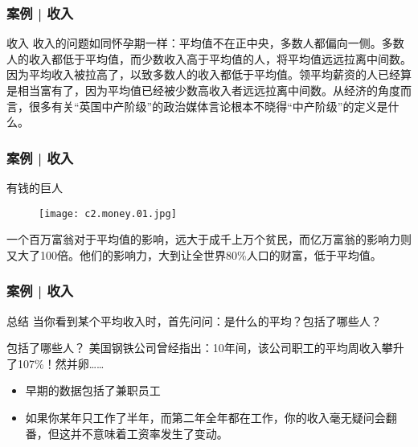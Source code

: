\begin{frame}
  \frametitle{案例 | 收入}
  \begin{block}{收入}
    收入的问题如同怀孕期一样：平均值不在正中央，多数人都偏向一侧。多数人的收入都低于平均值，而少数收入高于平均值的人，将平均值远远拉离中间数。因为平均收入被拉高了，以致多数人的收入都低于平均值。领平均薪资的人已经算是相当富有了，因为平均值已经被少数高收入者远远拉离中间数。从经济的角度而言，很多有关“英国中产阶级”的政治媒体言论根本不晓得“中产阶级”的定义是什么。
  \end{block}
\end{frame}

\begin{frame}
  \frametitle{案例 | 收入}
  \begin{block}{有钱的巨人}
  \begin{figure}
    \centering
    \texttt{[image: c2.money.01.jpg]}
  \end{figure}
  一个百万富翁对于平均值的影响，远大于成千上万个贫民，而亿万富翁的影响力则又大了100倍。他们的影响力，大到让全世界80\%人口的财富，低于平均值。
  \end{block}
\end{frame}

\begin{frame}
  \frametitle{案例 | 收入}
  \begin{block}{总结}
    当你看到某个平均收入时，首先问问：是什么的平均？包括了哪些人？
  \end{block}
  \pause
  \begin{block}{包括了哪些人？}
    美国钢铁公司曾经指出：10年间，该公司职工的平均周收入攀升了107\%！然并卵……
    \begin{itemize}
      \item 早期的数据包括了兼职员工
      \item 如果你某年只工作了半年，而第二年全年都在工作，你的收入毫无疑问会翻番，但这并不意味着工资率发生了变动。
    \end{itemize}
  \end{block}
\end{frame}

